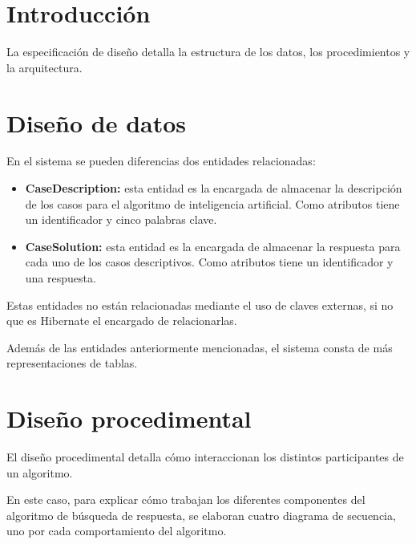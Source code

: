 
\section{Introducción}

La especificación de diseño detalla la estructura de los datos, los procedimientos y la arquitectura.

\section{Diseño de datos}

En el sistema se pueden diferencias dos entidades relacionadas:

\begin{itemize}
\tightlist
\item \textbf{CaseDescription:} esta entidad es la encargada de almacenar la descripción de los casos para el algoritmo de inteligencia artificial. Como atributos tiene un identificador y cinco palabras clave.
\item \textbf{CaseSolution:} esta entidad es la encargada de almacenar la respuesta para cada uno de los casos descriptivos. Como atributos tiene un identificador y una respuesta.
\end{itemize}

Estas entidades no están relacionadas mediante el uso de claves externas, si no que es Hibernate el encargado de relacionarlas.


Además de las entidades anteriormente mencionadas, el sistema consta de más representaciones de tablas.


\section{Diseño procedimental}

El diseño procedimental detalla cómo interaccionan los distintos participantes de un algoritmo.

En este caso, para explicar cómo trabajan los diferentes componentes del algoritmo de búsqueda de respuesta, se elaboran cuatro diagrama de secuencia, uno por cada comportamiento del algoritmo.


